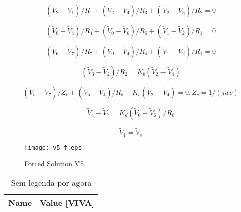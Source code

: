 
\begin{equation}
  (\tilde{V}_2 - \tilde{V}_1)/R_1 + (\tilde{V}_2 - \tilde{V}_4)/R_3 + (\tilde{V}_2 - \tilde{V}_3)/R_2 = 0
  \label{eq:4_13}
\end{equation}

\begin{equation}
 (\tilde{V}_0 - \tilde{V}_4)/R_4 + (\tilde{V}_0 - \tilde{V}_6)/R_6 + (\tilde{V}_1 - \tilde{V}_2)/R_1 = 0 
  \label{eq:4_14}
\end{equation}

\begin{equation}
  (\tilde{V}_6 - \tilde{V}_7)/R_7 + (\tilde{V}_0 - \tilde{V}_4)/R_4 + (\tilde{V}_1 - \tilde{V}_2)/R_1 = 0 
  \label{eq:4_15}
\end{equation}

\begin{equation}
  (\tilde{V}_3 - \tilde{V}_2)/R_2 = K_b(\tilde{V}_2 - \tilde{V}_4)
  \label{eq:4_16}
\end{equation}

\begin{equation}
  (\tilde{V}_5 - \tilde{V}_7)/Z_c + (\tilde{V}_5 - \tilde{V}_4)/R_5 + K_b(\tilde{V}_2 - \tilde{V}_4) = 0, Z_c = 1/(jwc)
  \label{eq:4_17}
\end{equation}

\begin{equation}
  \tilde{V}_4 - \tilde{V}_7 = K_d(\tilde{V}_0 - \tilde{V}_6)/R_6
  \label{eq:kvl18}
\end{equation}

\begin{equation}
  \tilde{V}_1 = \tilde{V}_s
  \label{eq:kvl19}
\end{equation}


\begin{figure}[h] \centering
\texttt{[image: v5\_f.eps]}
\caption{Forced Solution V5}
\label{fig:v5_f}
\end{figure}
\FloatBarrier

\begin{table}[h]
  \centering
  \begin{tabular}{|l|r|}
    \hline    
    {\bf Name} & {\bf Value [VIVA]} \\ \hline
    
  \end{tabular}
  \caption{Sem legenda por agora}
  \label{tab:Phasors}
\end{table}
\FloatBarrier


